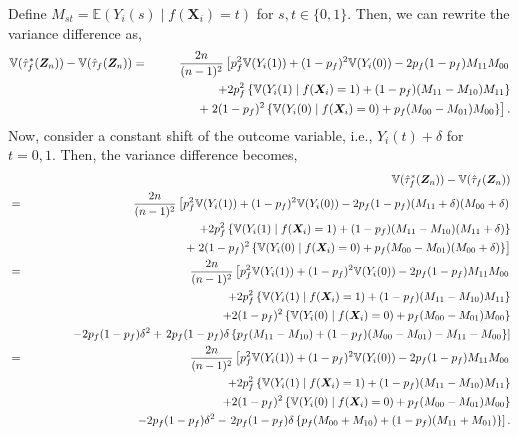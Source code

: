 \documentclass[USenglish,onecolumn]{article}
\renewcommand\r{\right}
\renewcommand\l{\left}
\newcommand\E{\mathbb{E}}
\newcommand\V{\mathbb{V}}
\newcommand\bX{\bm{X}}
\newcommand\bZ{\bm{Z}}
\begin{document}
Define $M_{st} = \E(Y_i(s) \mid f(\bX_i) =t)$ for $s,t \in
\{0,1\}$. Then, we can rewrite the variance difference as,
\begin{eqnarray*}
	\V(\hat{\tau}_f^*(\bZ_n))-\V(\hat{\tau}_f(\bZ_n))
	& = & \frac{2n}{(n-1)^2}\l[p_f^2\V(Y_i(1))+(1-p_f)^2\V(Y_i(0))
	-2p_f(1-p_f)M_{11}M_{00}  \r. \\ &  & \hspace{.5in}+  2 p_f^2 \l\{\V(Y_i(1) \mid f(\bX_i) = 1) + (1-p_f)(M_{11}-M_{10}) M_{11}\r\} \\
	& & \hspace{.5in} +  \l. 2 (1-p_f)^2 \l\{\V(Y_i(0) \mid f(\bX_i) = 0)+ p_f(M_{00}-M_{01}) M_{00}\r\} \r].
\end{eqnarray*}
Now, consider a constant shift of the outcome variable, i.e.,
$Y_i(t)+\delta $ for $t=0,1$. Then, the variance difference becomes,
\begin{eqnarray*}
	& &\V(\hat{\tau}_f^*(\bZ_n))-\V(\hat{\tau}_f(\bZ_n)) \\
	& = & \frac{2n}{(n-1)^2}\l[p_f^2\V(Y_i(1))+(1-p_f)^2\V(Y_i(0))
	-2p_f(1-p_f)(M_{11}+\delta)(M_{00}+\delta)  \r. \\ &  & \hspace{.5in}+  2 p_f^2 \l\{\V(Y_i(1) \mid f(\bX_i) = 1) + (1-p_f)(M_{11}-M_{10}) (M_{11}+\delta)\r\} \\
	& & \hspace{.5in} +  \l. 2 (1-p_f)^2 \l\{\V(Y_i(0) \mid f(\bX_i) = 0)+ p_f(M_{00}-M_{01}) (M_{00}+\delta)\r\} \r]\\
	& = & \frac{2n}{(n-1)^2}\l[p_f^2\V(Y_i(1))+(1-p_f)^2\V(Y_i(0))
	-2p_f(1-p_f)M_{11}M_{00}  \r. \\ &  & \hspace{.5in}+  2 p_f^2 \l\{\V(Y_i(1) \mid f(\bX_i) = 1) + (1-p_f)(M_{11}-M_{10}) M_{11}\r\} \\
	& & \hspace{.5in} +   2 (1-p_f)^2 \l\{\V(Y_i(0) \mid f(\bX_i) = 0)+ p_f(M_{00}-M_{01}) M_{00}\r\} \\
	& & \hspace{.5in} -   2 p_f(1-p_f) \delta^2  + \l. 2p_f(1-p_f)\delta \l\{p_f(M_{11}-M_{10})+(1-p_f)(M_{00}-M_{01})-M_{11}-M_{00}\r\}\r]\\
	& = & \frac{2n}{(n-1)^2}\l[p_f^2\V(Y_i(1))+(1-p_f)^2\V(Y_i(0))
	-2p_f(1-p_f)M_{11}M_{00}  \r. \\ &  & \hspace{.5in}+  2 p_f^2 \l\{\V(Y_i(1) \mid f(\bX_i) = 1) + (1-p_f)(M_{11}-M_{10}) M_{11}\r\} \\
	& & \hspace{.5in} +   2 (1-p_f)^2 \l\{\V(Y_i(0) \mid f(\bX_i) = 0)+ p_f(M_{00}-M_{01}) M_{00}\r\} \\
	& & \hspace{.5in} -   2 p_f(1-p_f) \delta^2  - \l.2p_f(1-p_f)\delta \l\{p_f(M_{00}+M_{10})+(1-p_f)(M_{11}+M_{01})\r\}\r].
\end{eqnarray*}
\end{document}
